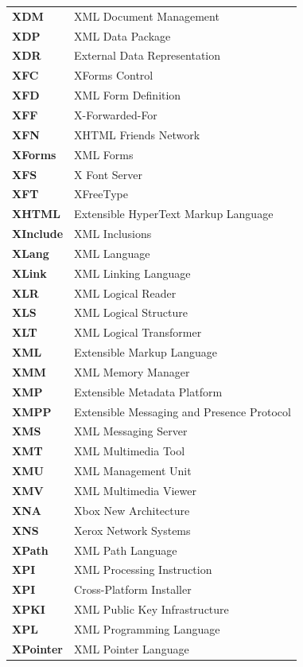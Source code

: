 \begin{longtable}{p{3cm}p{11cm}}
\textbf{XDM} & XML Document Management \\
\textbf{XDP} & XML Data Package \\
\textbf{XDR} & External Data Representation \\
\textbf{XFC} & XForms Control \\
\textbf{XFD} & XML Form Definition \\
\textbf{XFF} & X-Forwarded-For \\
\textbf{XFN} & XHTML Friends Network \\
\textbf{XForms} & XML Forms \\
\textbf{XFS} & X Font Server \\
\textbf{XFT} & XFreeType \\
\textbf{XHTML} & Extensible HyperText Markup Language \\
\textbf{XInclude} & XML Inclusions \\
\textbf{XLang} & XML Language \\
\textbf{XLink} & XML Linking Language \\
\textbf{XLR} & XML Logical Reader \\
\textbf{XLS} & XML Logical Structure \\
\textbf{XLT} & XML Logical Transformer \\
\textbf{XML} & Extensible Markup Language \\
\textbf{XMM} & XML Memory Manager \\
\textbf{XMP} & Extensible Metadata Platform \\
\textbf{XMPP} & Extensible Messaging and Presence Protocol \\
\textbf{XMS} & XML Messaging Server \\
\textbf{XMT} & XML Multimedia Tool \\
\textbf{XMU} & XML Management Unit \\
\textbf{XMV} & XML Multimedia Viewer \\
\textbf{XNA} & Xbox New Architecture \\
\textbf{XNS} & Xerox Network Systems \\
\textbf{XPath} & XML Path Language \\
\textbf{XPI} & XML Processing Instruction \\
\textbf{XPI} & Cross-Platform Installer \\
\textbf{XPKI} & XML Public Key Infrastructure \\
\textbf{XPL} & XML Programming Language \\
\textbf{XPointer} & XML Pointer Language \\

\end{longtable}
